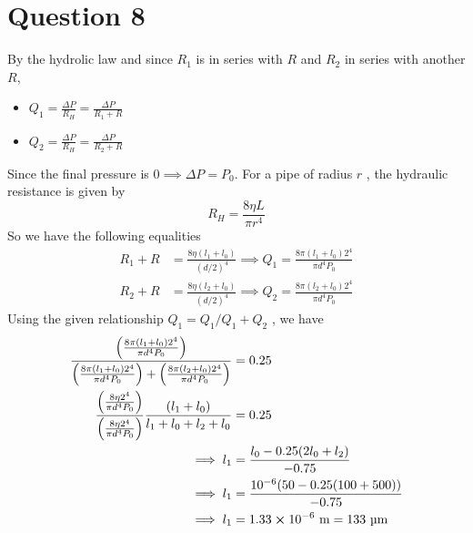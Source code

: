 \documentclass[
	12pt,
	]{article}
\theoremstyle{definition}
\theoremstyle{definition}
\theoremstyle{definition}
\theoremstyle{definition}
\theoremstyle{definition}
\theoremstyle{example}
\theoremstyle{note}
\theoremstyle{remark}
\theoremstyle{example}
\begin{document}
		  	\section{Question 8}
		  	By the hydrolic law and since $R_{1}$ is in series with $R$ and $R_{2}$ in series with another $R$,
		  	\begin{itemize}
		  		\item $Q_{1} = \frac{\Delta P}{R_{H}} = \frac{\Delta P}{R_{1} + R}$
		  		\item $Q_{2} = \frac{\Delta P}{R_{H}} = \frac{\Delta P}{R_{2} + R}$
		  	\end{itemize}
		  	Since the final pressure is $0 \implies \Delta P  = P_{0}$. For a pipe of radius $r$ , the hydraulic resistance is given by 
		  	$$ R_{H } = \frac{8 \eta L}{\pi r^{4}}$$
		  	So we have the following equalities 
		  	\begin{align*}
		  		R_{1} + R &= \frac{8 \eta (l_{1} + l_{0})}{(d/2)^{4}}  \implies Q_{1} = \frac{8 \pi (l_{1} + l_{0})2^{4}}{\pi d^{4} P_{0}}\\
		  		R_{2} + R &= \frac{8 \eta (l_{2} + l_{0})}{(d/2)^{4}} \implies Q_{2} = \frac{8 \pi (l_{2} + l_{0})2^{4}}{\pi d^{4} P_{0}}
		  	\end{align*}
		  	Using the given relationship $Q_{1} = Q_{1} / Q_{1} + Q_{2}$ , we have 
		  	\begin{align*}
		  		\frac{\left(\frac{8 \pi (l_{1} + l_{0})2^{4}}{\pi d^{4} P_{0}}\right)}{\left(\frac{8 \pi (l_{1} + l_{0})2^{4}}{\pi d^{4} P_{0}}\right) + \left(\frac{8 \pi (l_{2} + l_{0})2^{4}}{\pi d^{4} P_{0}}\right)} &= 0.25\\ 
		  		\frac{\left(\frac{8 \eta 2^{4}}{\pi d^{4} P_{0}}\right)}{\left(\frac{8 \eta 2^{4}}{\pi d^{4} P_{0}}\right)}  \frac{(l_{1} + l_{0})}{l_{1}+l_{0} + l_{2} + l_{0}}  &= 0.25 \\
		  		\implies l_{1} &= \frac{l_{0} -0.25(2l_{0} + l_{2})}{-0.75}\\
		  		\implies l_{1} &= \frac{10^{-6} (50 - 0.25(100 + 500))}{-0.75} \\
		  		\implies l_{1} &= 1.33 \cross 10^{-6} \ \si{\meter} = 133 \ \si{\micro\meter}
		  	\end{align*}
	
\end{document}
